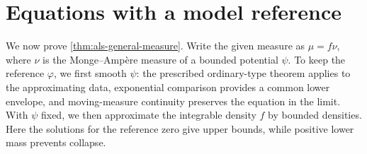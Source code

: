 \section{Equations with a model reference}
\label{sec:general-measure-relative}

We now prove \cref{thm:als-general-measure}. Write the given measure as $\mu=f\nu$, where $\nu$ is the Monge--Amp\`ere measure of a bounded potential $\psi$. To keep the reference $\varphi$, we first smooth $\psi$: the prescribed ordinary-type theorem applies to the approximating data, exponential comparison provides a common lower envelope, and moving-measure continuity preserves the equation in the limit. With $\psi$ fixed, we then approximate the integrable density $f$ by bounded densities. Here the solutions for the reference zero give upper bounds, while positive lower mass prevents collapse.

